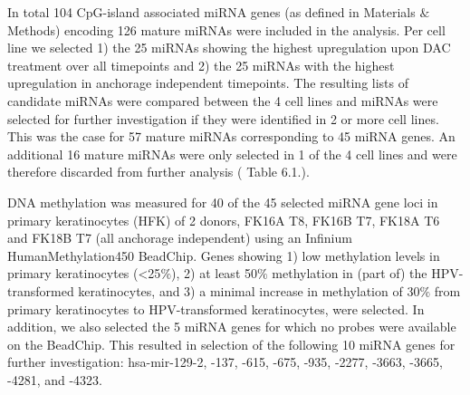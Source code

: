   In total 104 CpG-island associated miRNA genes (as defined in Materials $\&$ Methods) encoding 126 mature miRNAs were included in the analysis. Per cell line we selected 1) the 25 miRNAs showing the highest upregulation upon DAC treatment over all timepoints and 2) the 25 miRNAs with the highest upregulation in anchorage independent timepoints. The resulting lists of candidate miRNAs were compared between the 4 cell lines and miRNAs were selected for further investigation if they were identified in 2 or more cell lines. This was the case for  57 mature miRNAs corresponding to 45 miRNA genes. An additional 16 mature miRNAs were only selected in 1 of the 4 cell lines and were therefore discarded from further analysis ( \cite{Supp2018} Table 6.1.).

  DNA methylation was measured for 40 of the 45 selected miRNA gene loci in primary keratinocytes (HFK) of 2 donors, FK16A T8, FK16B T7, FK18A T6 and FK18B T7 (all anchorage independent) using an Infinium HumanMethylation450 BeadChip. Genes showing 1) low methylation levels in primary keratinocytes (<25$\%$), 2) at least 50$\%$ methylation in (part of) the HPV-transformed keratinocytes, and 3) a minimal increase in methylation of 30$\%$ from primary keratinocytes to HPV-transformed keratinocytes, were selected. In addition, we also selected the 5 miRNA genes for which no probes were available on the BeadChip. This resulted in selection of the following 10 miRNA genes for further investigation: hsa-mir-129-2, -137, -615, -675, -935, -2277, -3663, -3665, -4281, and -4323.
